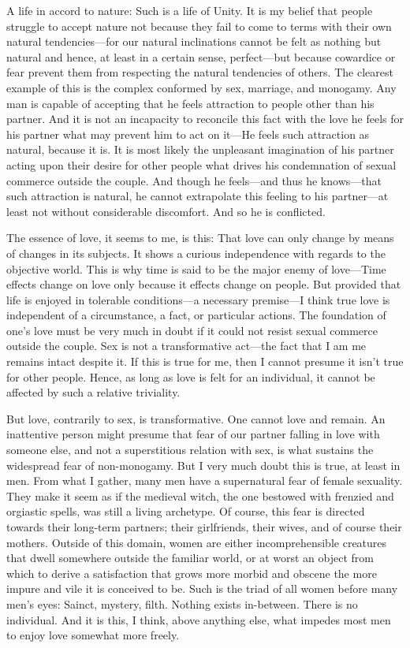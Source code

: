 \documentclass[a4paper, 12pt]{article}
\begin{document}
A life in accord to nature: Such is a life of Unity. It is my belief that
people struggle to accept nature not because they fail to come to terms with their own
natural tendencies---for our natural inclinations cannot be felt as nothing but
natural and hence, at least in a certain sense, perfect---but because cowardice
or fear prevent them from respecting the natural tendencies of others. 
The clearest example of this is the complex conformed by sex, marriage, and
monogamy. Any man is capable of accepting that he feels attraction to people
other than his partner. And it is not an incapacity to reconcile this fact with
the love he feels for his partner what may prevent him to act on it---He feels
such attraction as natural, because it is. It is most likely the unpleasant
imagination of his partner acting upon their desire for other people what
drives his condemnation of sexual commerce outside the couple. And though he
feels---and thus he knows---that such attraction is natural, he cannot
extrapolate this feeling to his partner---at least not without considerable
discomfort. And so he is conflicted.

The essence of love, it seems to me, is this: That love can only change by
means of changes in its subjects. It shows a curious independence with regards
to the objective world. This is why time is said to be the major enemy of
love—Time effects change on love only because it effects change on people. But
provided that life is enjoyed in tolerable conditions—a necessary premise—I
think true love is independent of a circumstance, a fact, or particular
actions. The foundation of one's love must be very much in doubt if it could
not resist sexual commerce outside the couple. Sex is not a transformative
act—the fact that I am me remains intact despite it. If this is true for me,
then I cannot presume it isn’t true for other people. Hence, as long as love is
felt for an individual, it cannot be affected by such a relative triviality.

But love, contrarily to sex, is transformative. One cannot love and remain. An
inattentive person might presume that fear of our partner falling in love with
someone else, and not a superstitious relation with sex, is what sustains the
widespread fear of non-monogamy. But I very much doubt this is true, at least
in men. From what I gather, many men have a supernatural fear of female
sexuality. They make it seem as if the medieval witch, the one bestowed with
frenzied and orgiastic spells, was still a living archetype. Of course, this
fear is directed towards their long-term partners; their girlfriends, their
wives, and of course their mothers. Outside of this domain, women are either
incomprehensible creatures that dwell somewhere outside the familiar world, or
at worst an object from which to derive a satisfaction that grows more morbid
and obscene the more impure and vile it is conceived to be. Such is the triad
of all women before many men’s eyes: Sainct, mystery, filth. Nothing exists
in-between. There is no individual. And it is this, I think, above anything
else, what impedes most men to enjoy love somewhat more freely. 
\end{document}
